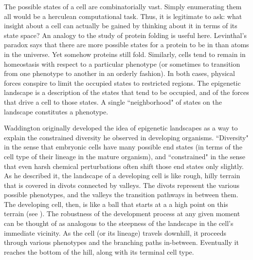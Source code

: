 The possible states of a cell are combinatorially vast. Simply enumerating them all would be a herculean computational task. Thus, it is legitimate to ask: what insight about a cell can actually be gained by thinking about it in terms of its state space? An analogy to the study of protein folding is useful here. Levinthal's paradox\supercite{Levinthal:1969uy} says that there are more possible states for a protein to be in than atoms in the universe. Yet somehow proteins still fold. Similarly, cells tend to remain in homeostasis with respect to a particular phenotype (or sometimes to transition from one phenotype to another in an orderly fashion). In both cases, physical forces conspire to limit the occupied states to restricted regions. The epigenetic landscape is a description of the states that tend to be occupied, and of the forces that drive a cell to those states. A single ``neighborhood" of states on the landscape constitutes a phenotype.

Waddington originally developed the idea of epigenetic landscapes as a way to explain the constrained diversity he observed in developing organisms. ``Diversity" in the sense that embryonic cells have many possible end states (in terms of the cell type of their lineage in the mature organism), and ``constrained" in the sense that even harsh chemical perturbations often shift those end states only slightly. As he described it, the landscape of a developing cell is like rough, hilly terrain that is covered in divots connected by valleys. The divots represent the various possible phenotypes, and the valleys the transition pathways in between them. The developing cell, then, is like a ball that starts at a a high point on this terrain (see ). The robustness of the development process at any given moment can be thought of as analogous to the steepness of the landscape in the cell's immediate vicinity. As the cell (or its lineage) travels downhill, it proceeds through various phenotypes and the branching paths in-between. Eventually it reaches the bottom of the hill, along with its terminal cell type.

